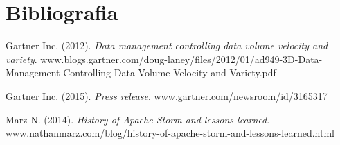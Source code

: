 \chapter*{Bibliografia}

\begin{references}

\item
Gartner Inc. (2012). \textit{Data management controlling data volume velocity and variety}.
www.blogs.gartner.com/doug-laney/files/2012/01/ad949-3D-Data-Management-Controlling-Data-Volume-Velocity-and-Variety.pdf

\item
Gartner Inc. (2015). \textit{Press release}.
www.gartner.com/newsroom/id/3165317

\item
Marz N. (2014). \textit{History of Apache Storm and lessons learned}.
www.nathanmarz.com/blog/history-of-apache-storm-and-lessons-learned.html

\end{references}
